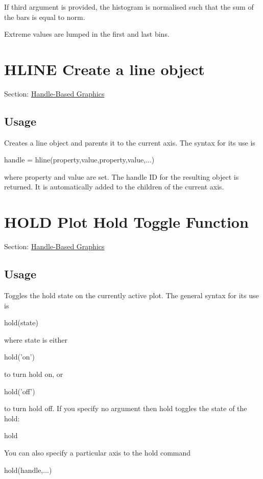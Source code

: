 If third argument is provided, the histogram is normalised such that the sum of the bars is equal to {\ttfamily norm}.

Extreme values are lumped in the first and last bins. \hypertarget{handle_hline}{}\section{H\-L\-I\-N\-E Create a line object}\label{handle_hline}
Section\-: \hyperlink{sec_handle}{Handle-\/\-Based Graphics} \hypertarget{vtkwidgets_vtkxyplotwidget_Usage}{}\subsection{Usage}\label{vtkwidgets_vtkxyplotwidget_Usage}
Creates a line object and parents it to the current axis. The syntax for its use is \begin{DoxyVerb}  handle = hline(property,value,property,value,...)
\end{DoxyVerb}
 where {\ttfamily property} and {\ttfamily value} are set. The handle I\-D for the resulting object is returned. It is automatically added to the children of the current axis. \hypertarget{handle_hold}{}\section{H\-O\-L\-D Plot Hold Toggle Function}\label{handle_hold}
Section\-: \hyperlink{sec_handle}{Handle-\/\-Based Graphics} \hypertarget{vtkwidgets_vtkxyplotwidget_Usage}{}\subsection{Usage}\label{vtkwidgets_vtkxyplotwidget_Usage}
Toggles the hold state on the currently active plot. The general syntax for its use is \begin{DoxyVerb}   hold(state)
\end{DoxyVerb}
 where {\ttfamily state} is either \begin{DoxyVerb}   hold('on')
\end{DoxyVerb}
 to turn hold on, or \begin{DoxyVerb}   hold('off')
\end{DoxyVerb}
 to turn hold off. If you specify no argument then {\ttfamily hold} toggles the state of the hold\-: \begin{DoxyVerb}   hold
\end{DoxyVerb}
 You can also specify a particular axis to the hold command \begin{DoxyVerb}   hold(handle,...)
\end{DoxyVerb}
